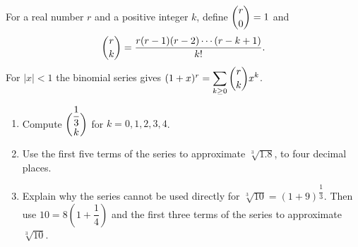 For a real number $r$ and a positive integer $k$, define $\dbinom r0=1$ and
\[\dbinom rk=\dfrac{r(r-1)(r-2)\cdots(r-k+1)}{k!}.\]
For $|x|<1$ the binomial series gives $(1+x)^r=\displaystyle\sum_{k\ge0}\dbinom rk x^k$.
\begin{enumerate}
\item[(a)] Compute $\dbinom{\dfrac13}{k}$ for $k=0,1,2,3,4$.
\item[(b)] Use the first five terms of the series to approximate $\sqrt[3]{1.8}$, to four decimal places.
\item[(c)] Explain why the series cannot be used directly for $\sqrt[3]{10}=(1+9)^{\dfrac13}$. Then use $10=8\left(1+\dfrac14\right)$ and the first three terms of the series to approximate $\sqrt[3]{10}$.
\end{enumerate}
